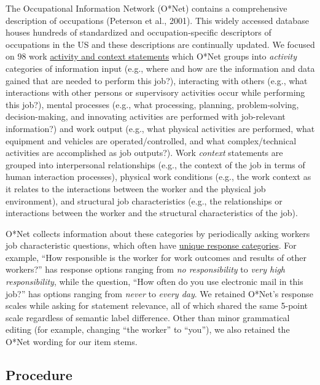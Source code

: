 \documentclass[
  jou,mask]{apa6}
\begin{document}
The Occupational Information Network (O*Net) contains a comprehensive description of occupations (Peterson et al., 2001). This widely accessed database houses hundreds of standardized and occupation-specific descriptors of occupations in the US and these descriptions are continually updated. We focused on 98 work \href{https://www.ONETonline.org/find/descriptor/result/4.A.1.b.3}{activity and context statements} which O*Net groups into \emph{activity} categories of information input (e.g., where and how are the information and data gained that are needed to perform this job?), interacting with others (e.g., what interactions with other persons or supervisory activities occur while performing this job?), mental processes (e.g., what processing, planning, problem-solving, decision-making, and innovating activities are performed with job-relevant information?) and work output (e.g., what physical activities are performed, what equipment and vehicles are operated/controlled, and what complex/technical activities are accomplished as job outputs?). Work \emph{context} statements are grouped into interpersonal relationships (e.g., the context of the job in terms of human interaction processes), physical work conditions (e.g., the work context as it relates to the interactions between the worker and the physical job environment), and structural job characteristics (e.g., the relationships or interactions between the worker and the structural characteristics of the job).

O*Net collects information about these categories by periodically asking workers job characteristic questions, which often have \href{https://www.ONETonline.org/find/descriptor/result/4.C.1.c.2}{unique response categories}. For example, ``How responsible is the worker for work outcomes and results of other workers?'' has response options ranging from \emph{no responsibility} to \emph{very high responsibility}, while the question, ``How often do you use electronic mail in this job?'' has options ranging from \emph{never} to \emph{every day}. We retained O*Net's response scales while asking for statement relevance, all of which shared the same 5-point scale regardless of semantic label difference. Other than minor grammatical editing (for example, changing ``the worker'' to ``you''), we also retained the O*Net wording for our item stems.

\hypertarget{procedure}{%
\subsection{Procedure}\label{procedure}}
\end{document}
